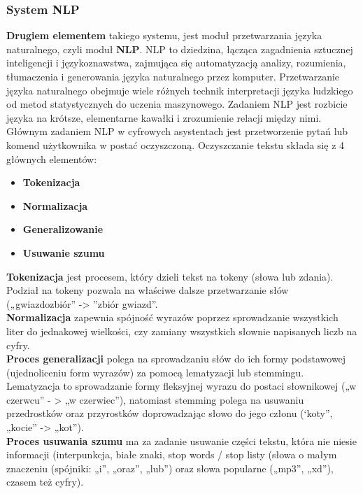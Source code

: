 \subsubsection{System NLP}

\textbf{Drugiem elementem} takiego systemu, jest moduł przetwarzania języka naturalnego, czyli moduł \textbf{NLP}. NLP to dziedzina, łącząca zagadnienia sztucznej inteligencji i językoznawstwa, zajmująca się automatyzacją analizy, rozumienia, tłumaczenia i generowania języka naturalnego przez komputer. Przetwarzanie języka naturalnego obejmuje wiele różnych technik interpretacji języka ludzkiego od metod statystycznych do uczenia maszynowego. Zadaniem NLP jest rozbicie języka na krótsze, elementarne kawałki i zrozumienie relacji między nimi. \\

Głównym zadaniem NLP w cyfrowych asystentach jest przetworzenie pytań lub komend użytkownika w postać oczyszczoną. Oczyszczanie tekstu składa się z 4 głównych elementów:

\begin{itemize}
	\item \textbf{Tokenizacja} 
	\item \textbf{Normalizacja} 
	\item \textbf{Generalizowanie} 
	\item \textbf{Usuwanie szumu} \\
\end{itemize}

\textbf{Tokenizacja} jest procesem, który dzieli tekst na tokeny (słowa lub zdania). Podział na tokeny pozwala na właściwe dalsze przetwarzanie słów („gwiazdozbiór” -> ”zbiór gwiazd”. \\

\textbf{Normalizacja} zapewnia spójność wyrazów poprzez sprowadzanie wszystkich liter do jednakowej wielkości, czy zamiany wszystkich słownie napisanych liczb na cyfry. \\

\textbf{Proces generalizacji} polega na sprowadzaniu słów do ich formy podstawowej (ujednoliceniu form wyrazów) za pomocą lematyzacji lub stemmingu. Lematyzacja to sprowadzanie formy fleksyjnej wyrazu do postaci słownikowej („w czerwcu” - > „w czerwiec”), natomiast stemming polega na usuwaniu przedrostków oraz przyrostków doprowadzając słowo do jego członu (‘koty”, „kocie” -> „kot”). \\

\textbf{Proces usuwania szumu} ma za zadanie usuwanie części tekstu, która nie niesie informacji (interpunkcja, białe znaki, stop words / stop listy (słowa o małym znaczeniu (spójniki: „i”, „oraz”, „lub”) oraz słowa popularne („mp3”, „xd”), czasem też cyfry). \\

